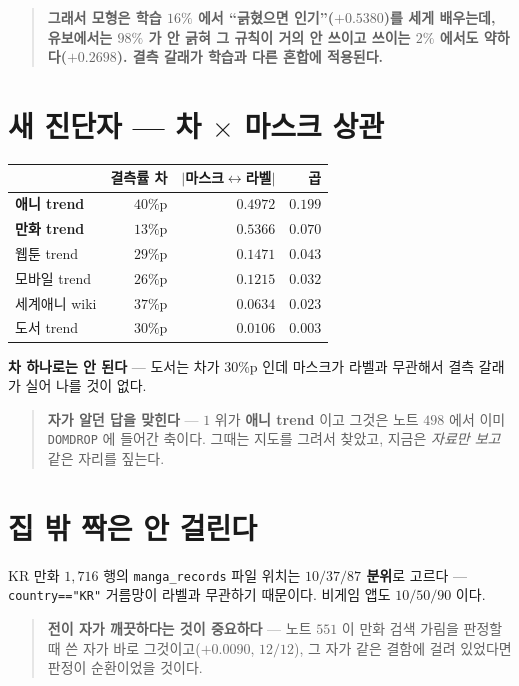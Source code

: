 \documentclass[11pt]{article}
\begin{document}
\begin{quote}
\textbf{그래서 모형은 학습 $16\%$ 에서 ``긁혔으면 인기''($+0.5380$)를 세게
배우는데, 유보에서는 $98\%$ 가 안 긁혀 그 규칙이 거의 안 쓰이고 쓰이는
$2\%$ 에서도 약하다($+0.2698$). 결측 갈래가 학습과 다른 혼합에 적용된다.}
\end{quote}

\section{새 진단자 --- 차 $\times$ 마스크 상관}

\begin{center}
\begin{tabular}{lrrr}
\hline
 & 결측률 차 & $|$마스크$\leftrightarrow$라벨$|$ & 곱 \\
\hline
\textbf{애니 trend} & $40$\%p & $0.4972$ & $\mathbf{0.199}$ \\
\textbf{만화 trend} & $13$\%p & $0.5366$ & $\mathbf{0.070}$ \\
웹툰 trend & $29$\%p & $0.1471$ & $0.043$ \\
모바일 trend & $26$\%p & $0.1215$ & $0.032$ \\
세계애니 wiki & $37$\%p & $0.0634$ & $0.023$ \\
도서 trend & $30$\%p & $0.0106$ & $0.003$ \\
\hline
\end{tabular}
\end{center}

\textbf{차 하나로는 안 된다} --- 도서는 차가 $30$\%p 인데 마스크가 라벨과
무관해서 결측 갈래가 실어 나를 것이 없다.

\begin{quote}
\textbf{자가 알던 답을 맞힌다} --- $1$ 위가 \textbf{애니 trend} 이고
그것은 노트 $498$ 에서 이미 \texttt{DOMDROP} 에 들어간 축이다. 그때는
지도를 그려서 찾았고, 지금은 \emph{자료만 보고} 같은 자리를 짚는다.
\end{quote}

\section{집 밖 짝은 안 걸린다}

KR 만화 $1{,}716$ 행의 \texttt{manga\_records} 파일 위치는
\textbf{$10/37/87$ 분위}로 고르다 --- \texttt{country=="KR"} 거름망이 라벨과
무관하기 때문이다. 비게임 앱도 $10/50/90$ 이다.

\begin{quote}
\textbf{전이 자가 깨끗하다는 것이 중요하다} --- 노트 $551$ 이 만화 검색
가림을 판정할 때 쓴 자가 바로 그것이고($+0.0090$, $12/12$), 그 자가 같은
결함에 걸려 있었다면 판정이 순환이었을 것이다.
\end{quote}
\end{document}

